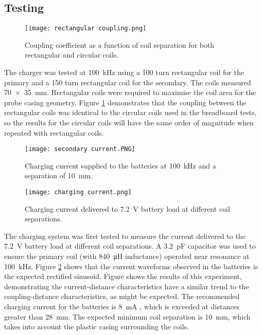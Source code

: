 \subsection{Testing}
\begin{figure}[htbp]
	\centering
	\texttt{[image: rectangular coupling.png]}
	\caption{Coupling coefficient as a function of coil separation for both rectangular and circular coils.}
	\label{fig: rectangular coupling}
\end{figure}


The charger was tested at \SI{100}{\kilo\hertz} using a 100 turn rectangular coil for the primary and a 150 turn rectangular coil for the secondary. The coils measured \SI{70 x 35}{\milli\metre}. Rectangular coils were required to maximise the coil area for the probe casing geometry. Figure \ref{fig: rectangular coupling} demonstrates that the coupling between the rectangular coils was identical to the circular coils used in the breadboard tests, so the results for the circular coils will have the same order of magnitude when repeated with rectangular coils.\\


\begin{figure}[htbp]
	\centering
	\texttt{[image: secondary current.PNG]}
	\caption{Charging current supplied to the batteries at \SI{100}{\kilo\hertz} and a separation of \SI{10}{\milli\metre}.}
	\label{fig: secondary current}
\end{figure}



\begin{figure}[htbp]
	\centering
	\texttt{[image: charging current.png]}
	\caption{Charging current delivered to \SI{7.2}{\volt} battery load at different coil separations.}
	\label{fig: current distance}
\end{figure}

The charging system was first tested to measure the current delivered to the \SI{7.2}{\volt} battery load at different coil separations. A \SI{3.2}{\pico\farad} capacitor was used to ensure the primary coil (with \SI{840}{\micro\henry} inductance) operated near resonance at \SI{100}{\kilo\hertz}. Figure \ref{fig: secondary current} shows that the current waveforms observed in the batteries is the expected rectified sinusoid. Figure \label{fig: current distance} shows the results of this experiment, demonstrating the current-distance characteristics have a similar trend to the coupling-distance characteristics, as might be expected. The recommended charging current for the batteries is \SI{8}{\milli\ampere} \cite{rs_pro_batteries}, which is exceeded at distances greater than \SI{28}{\milli\metre}. The expected minimum coil separation is \SI{10}{\milli\metre}, which takes into account the plastic casing surrounding the coils.\\

